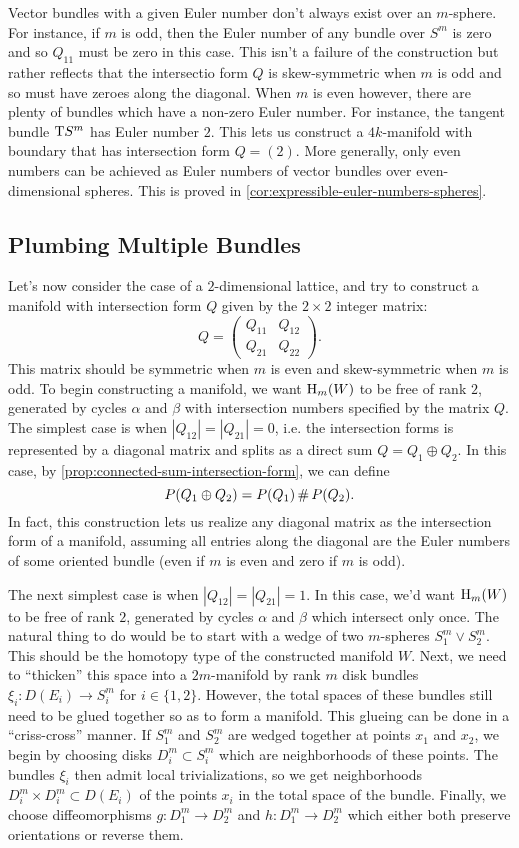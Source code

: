 Vector bundles with a given Euler number don't always exist over an $m$-sphere. For instance, if $m$ is odd, then the Euler number of any bundle over $S^m$ is zero and so $Q_{11}$ must be zero in this case. This isn't a failure of the construction but rather reflects that the intersectio form $Q$ is skew-symmetric when $m$ is odd and so must have zeroes along the diagonal. 
When $m$ is even however, there are plenty of bundles which have a non-zero Euler number. For instance, the tangent bundle $\mathrm{T} S^m$ has Euler number $2$. This lets us construct a $4k$-manifold with boundary that has intersection form $Q = (2)$. More generally, only even numbers can be achieved as Euler numbers of vector bundles over even-dimensional spheres. This is proved in \cref{cor:expressible-euler-numbers-spheres}.

\subsection{Plumbing Multiple Bundles}

Let's now consider the case of a $2$-dimensional lattice, and try to construct a manifold with intersection form $Q$ given by the $2\times 2$ integer matrix:
\[
	Q = \begin{pmatrix} Q_{11} & Q_{12} \\ Q_{21} & Q_{22}\end{pmatrix}.
\]
This matrix should be symmetric when $m$ is even and skew-symmetric when $m$ is odd. To begin constructing a manifold, we want $\operatorname{H}_m(W)$ to be free of rank $2$, generated by cycles $\alpha$ and $\beta$ with intersection numbers specified by the matrix $Q$. The simplest case is when $|Q_{12}|=|Q_{21}|=0$, i.e. the intersection forms is represented by a diagonal matrix and splits as a direct sum $Q=Q_1\oplus Q_2$. In this case, by \cref{prop:connected-sum-intersection-form}, we can define
\[
	P(Q_1\oplus Q_2) = P(Q_1)\,\#\, P(Q_2).
\]
In fact, this construction lets us realize any diagonal matrix as the intersection form of a manifold, assuming all entries along the diagonal are the Euler numbers of some oriented bundle (even if $m$ is even and zero if $m$ is odd).

The next simplest case is when $|Q_{12}|=|Q_{21}|=1$. In this case, we'd want $\operatorname{H}_m(W)$ to be free of rank $2$, generated by cycles $\alpha$ and $\beta$ which intersect only once. The natural thing to do would be to start with a wedge of two $m$-spheres $S^m_1\vee S^m_2$. This should be the homotopy type of the constructed manifold $W$. Next, we need to ``thicken'' this space into a $2m$-manifold by rank $m$ disk bundles $\xi_i : D(E_i) \to S^m_i$ for $i\in\{1,2\}$. However, the total spaces of these bundles still need to be glued together so as to form a manifold. This glueing can be done in a ``criss-cross'' manner. If $S^m_1$ and $S^m_2$ are wedged together at points $x_1$ and $x_2$, we begin by choosing disks $D_i^m\subset S^m_i$ which are neighborhoods of these points. The bundles $\xi_i$ then admit local trivializations, so we get neighborhoods $D_i^m\times D^m_i \subset D(E_i)$ of the points $x_i$ in the total space of the bundle. Finally, we choose diffeomorphisms $g : D_1^m \to D_2^m$ and $h : D_1^m \to D_2^m$ which either both preserve orientations or reverse them.

